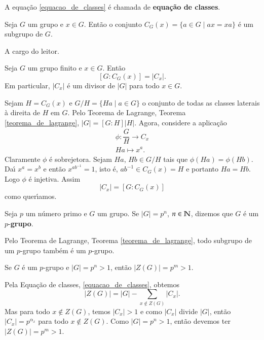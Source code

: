A equa\c{c}\~ao \eqref{equacao_de_classes} \'e chamada de \textbf{equa\c{c}\~ao de classes}.

\begin{proposicao}
	Seja $G$ um grupo e $x \in G$. Ent\~ao o conjunto $C_G(x) = \{a \in G \mid ax = xa\}$ \'e um subgrupo de $G$.
\end{proposicao}
\begin{prova}
	A cargo do leitor.
\end{prova}

\begin{proposicao}
	Seja $G$ um grupo finito e $x \in G$. Ent\~ao
	\[
		[G : C_G(x)] = |C_x|.
	\]
	Em particular, $|C_x|$ \'e um divisor de $|G|$ para todo $x \in G$.
\end{proposicao}
\begin{prova}
	Sejam $H = C_G(x)$ e $G/H = \{Ha \mid a \in G\}$ o conjunto de todas as classes laterais \`a direita de $H$ em $G$. Pelo Teorema de Lagrange, Teorema \ref{teorema_de_lagrange}, $|G| = [G : H]|H|$. Agora, considere a aplica\c{c}\~ao
	\begin{align*}
		\phi : \dfrac{G}{H} \to C_x\\
		Ha \mapsto x^a.
	\end{align*}
	Claramente $\phi$ \'e sobrejetora. Sejam $Ha$, $Hb \in G/H$ tais que $\phi(Ha) = \phi(Hb)$. Da{\'\i} $x^a = x^b$ e ent\~ao $x^{ab^{-1}} = 1$, isto \'e, $ab^{-1} \in C_G(x) = H$ e portanto $Ha = Hb$. Logo $\phi$ \'e injetiva. Assim
	\[
		|C_x| = [G : C_G(x)]
	\]
	como quer{\'\i}amos.
\end{prova}

\begin{definicao}
	Seja $p$ um n\'umero primo e $G$ um grupo. Se $|G| = p^n$, $n \in \mathbb{N}$, dizemos que $G$ \'e um $p$-\textbf{grupo}.
\end{definicao}

\begin{observacao}
	Pelo Teorema de Lagrange, Teorema \ref{teorema_de_lagrange}, todo subgrupo de um $p$-grupo tamb\'em \'e um $p$-grupo.
\end{observacao}

\begin{teorema}
	Se $G$ \'e um $p$-grupo e $|G| = p^n > 1$, ent\~ao $|Z(G)| = p^m > 1$.
\end{teorema}
\begin{prova}
	Pela Equa\c{c}\~ao de classes, \eqref{equacao_de_classes}, obtemos
	\[
		|Z(G)| = |G| - \sum_{x \notin Z(G)}|C_x|.
	\]
	Mas para todo $x \notin Z(G)$, temos $|C_x| > 1$ e como $|C_x|$ divide $|G|$, ent\~ao $|C_x| = p^{\alpha_x}$ para todo $x \notin Z(G)$. Como $|G| = p^n > 1$, ent\~ao devemos ter $|Z(G)| = p^m > 1$.
\end{prova}


